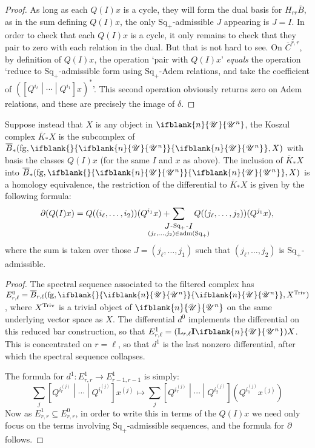 \documentclass[10pt]{article}
\makeatletter
\newcommand{\nontop}[1]{\ifblank{#1}{\scrU}{\scrU^{#1}}}
\newcommand{\produces}[3]{{#1}{#3}{#2}}
\newcommand{\admis}[1]{\mathrm{adm}(#1)}%
\newcommand{\Ind}[2][]{\mathbf{I}{#2}_{#1}}%
\newcommand{\forget}{\mathrm{fg}}
\newcommand{\Fr}[2][]{\ifblank{#1}{#2}{#2_{#1}}}
\newcommand{\derived}{\mathbb{L}}
\renewcommand{\Q}{Q}
\newcommand{\SqShift}{\Sq_{+}}
\newcommand{\Sq}{\mathrm{Sq}}
\renewcommand{\produces}[3]{
{
\def\labelstyle{\scriptstyle}
\xymatrix@C=2em@1{
{#1}
\ar@{-}[r]|-{{\,#3\,}}
&%
{#2}%
}}}
\makeatother
\begin{document}
\begin{KoszulComplexes2plus}
\begin{proof}
As long as each $\Q(I)x$ is a cycle, they will form the dual basis for $H_{rr}\overline{B}$, as in the sum defining $\Q(I)x$, the only $\SqShift$-admissible $J$ appearing is $J=I$. In order to check that each $\Q(I)x$ is a cycle, it only remains to check that they pair to zero with each relation in the dual. But that is not hard to see. On $\overline{C}^{r,r}$, by definition of $\Q(I)x$, the operation `pair with $\Q(I)x$' \emph{equals} the operation `reduce to $\SqShift$-admissible form using $\SqShift$-Adem relations, and take the coefficient of $(\left[\Q^{i_\ell}\middle|\cdots\middle|\Q^{i_1} \right]x)^*$'. This second operation obviously returns zero on Adem relations, and these are precisely the image of $\delta$.
\end{proof}
\begin{prop}
Suppose instead that $X$ is any object in $\nontop{n}$, the Koszul complex $\overline{K}_*X$ is the subcomplex of $\overline{B}_*(\forget,\Fr{\nontop{n}},X)$ with basis the classes $\Q(I)x$ (for the same $I$ and $x$ as above). The inclusion of $\overline{K}_*X$ into $\overline{B}_*(\forget,\Fr{\nontop{n}},X)$ is a homology equivalence, the restriction of the differential to $\overline{K}_*X$ is given by the following formula:
\[\partial(\Q(I)x)=\Q((i_{\ell},\ldots,i_2))(\Q^{i_1}x)+\!\!\!\!\!\!\!\!\!\!\!\!\!\!\!\!\!\sum_{\substack{\produces{J}{I}{\SqShift}\\(j_{\ell},\ldots,j_2)\in\admis{\SqShift}}}\!\!\!\!\!\!\!\!\!\!\!\! \Q((j_{\ell},\ldots,j_2))(\Q^{j_1}x),\]
where the sum is taken over those $J=(j_{\ell},\ldots,j_1)$ such that $(j_{\ell},\ldots,j_2)$ is $\SqShift$-admissible.
\end{prop}
\begin{proof}
The spectral sequence associated to the filtered complex has $E^0_{r,\ell}=\overline{B}_{r,\ell}(\forget,\Fr{\nontop{n}},X^\textup{Triv})$, where $X^\textup{Triv}$ is a trivial object of $\nontop{n}$ on the same underlying vector space as $X$. The differential $d^0$ implements the differential on this reduced bar construction, so that $E^1_{r,\ell}=(\derived_{r,\ell}\Ind{\nontop{n}})X$. This is concentrated on $r=\ell$, so that $d^1$ is the last nonzero differential, after which the spectral sequence collapses.

The formula for $d^1:E^1_{r,r}\to E^1_{r-1,r-1}$ is simply:
\[\sum_j \left[\Q^{i_r^{(j)}}\middle|\cdots \middle|\Q^{i_1^{(j)}}\right]x^{(j)}
\mapsto
\sum_j \left[\Q^{i_r^{(j)}}\middle|\cdots \middle|\Q^{i_2^{(j)}}\right]\left(\Q^{i_1^{(j)}}x^{(j)}\right)\]
Now as $E^1_{r,r}\subseteq E^0_{r,r}$, in order to write this in terms of the $\Q(I)x$ we need only focus on the terms involving $\SqShift$-admissible sequences, and the formula for $\partial$ follows.
\end{proof}


\end{KoszulComplexes2plus}
\end{document}
